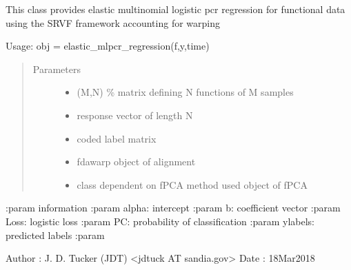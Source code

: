 \documentclass[letterpaper,10pt,english]{sphinxmanual}
\begin{document}
\begin{fulllineitems}
\label{\detokenize{pcr_regression:pcr_regression.elastic_mlpcr_regression}}
This class provides elastic multinomial logistic pcr regression for functional
data using the SRVF framework accounting for warping

Usage:  obj = elastic\_mlpcr\_regression(f,y,time)
\begin{quote}\begin{description}
\item[{Parameters}] \leavevmode\begin{itemize}
\item {} 
 \textendash{} (M,N) \% matrix defining N functions of M samples

\item {} 
 \textendash{} response vector of length N

\item {} 
 \textendash{} coded label matrix

\item {} 
 \textendash{} fdawarp object of alignment

\item {} 
 \textendash{} class dependent on fPCA method used object of fPCA

\end{itemize}

\end{description}\end{quote}

:param information
:param alpha: intercept
:param b: coefficient vector
:param Loss: logistic loss
:param PC: probability of classification
:param ylabels: predicted labels
:param

Author :  J. D. Tucker (JDT) \textless{}jdtuck AT sandia.gov\textgreater{}
Date   :  18\sphinxhyphen{}Mar\sphinxhyphen{}2018


\end{fulllineitems}
\end{document}
